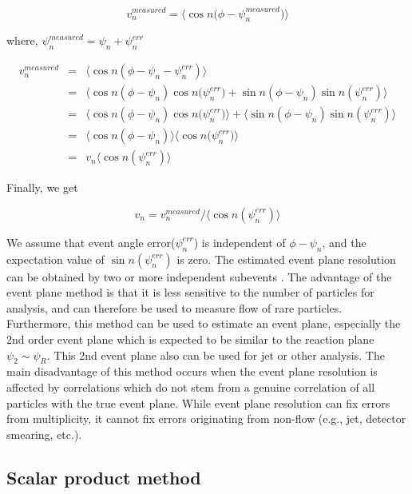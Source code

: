 \begin{equation}
v_n^{measured}=\langle\cos{n({\phi-\psi_n^{measured})}}\rangle
\end{equation}
\smallskip

where, $\psi_n^{measured} = \psi_n + \psi_n^{err}$

\begin{eqnarray}
v_n^{measured}&=&\langle\cos{n(\phi-\psi_n-\psi_n^{err})}\rangle \\
&=&\langle\cos{n(\phi-\psi_n)}\cos{n(\psi_n^{err}})+\sin{n(\phi-\psi_n)}\sin{n(\psi_n^{err})}\rangle \\
&=&\langle\cos{n(\phi-\psi_n)}\cos{n(\psi_n^{err}})\rangle+\langle\sin{n(\phi-\psi_n)}\sin{n(\psi_n^{err})}\rangle \\
&=&\langle\cos{n(\phi-\psi_n)}\rangle\langle\cos{n(\psi_n^{err}})\rangle \\
&=&v_n\langle\cos{n(\psi_n^{err})}\rangle
\end{eqnarray}

Finally, we get 

\begin {equation}
v_n = v_n^{measured}/\langle\cos{n(\psi_n^{err})}\rangle
\end {equation}
\smallskip


We assume that event angle error($\psi_n^{err}$) is independent of $\phi-\psi_n$, and the expectation value of $\sin{n(\psi_n^{err})}$ is zero. The estimated event plane resolution can be obtained by two or more independent subevents \cite{PhysRevC.58.1671}. The advantage of the event plane method is that it is less sensitive to the number of particles for analysis, and can therefore be used to measure flow of rare particles. Furthermore, this method can be used to estimate an event plane, especially the 2nd order event plane which is expected to be similar to the reaction plane $\psi_2 \sim \psi_R$. This 2nd event plane also can be used for jet or other analysis. The main disadvantage of this method occurs when the event plane resolution is affected by correlations which do not stem from a genuine correlation of all particles with the true event plane. While event plane resolution can fix errors from multiplicity, it cannot fix errors originating from non-flow (e.g., jet, detector smearing, etc.). 

\subsection{Scalar product method}

